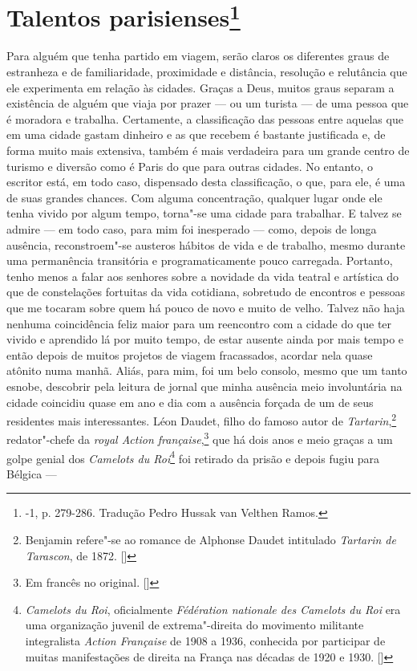 \chapter{Talentos parisienses\footnote[*]{-1, p.
  279-286. Tradução Pedro Hussak van Velthen Ramos.}}

Para alguém que tenha partido em viagem, serão claros os diferentes
graus de estranheza e de familiaridade, proximidade e distância,
resolução e relutância que ele experimenta em relação às cidades. Graças
a Deus, muitos graus separam a existência de alguém que viaja por prazer
--- ou um turista --- de uma pessoa que é moradora e trabalha. Certamente, a
classificação das pessoas entre aquelas que em uma cidade gastam
dinheiro e as que recebem é bastante justificada e, de forma muito mais
extensiva, também é mais verdadeira para um grande centro de turismo e
diversão como é Paris do que para outras cidades. No entanto, o escritor
está, em todo caso, dispensado desta classificação, o que, para ele, é
uma de suas grandes chances. Com alguma concentração, qualquer lugar
onde ele tenha vivido por algum tempo, torna"-se uma cidade para
trabalhar. E talvez se admire --- em todo caso, para mim foi inesperado
--- como, depois de longa ausência, reconstroem"-se austeros hábitos de
vida e de trabalho, mesmo durante uma permanência transitória e
programaticamente pouco carregada. Portanto, tenho menos a falar aos
senhores sobre a novidade da vida teatral e artística do que de
constelações fortuitas da vida cotidiana, sobretudo de encontros e
pessoas que me tocaram sobre quem há pouco de novo e muito de velho.
Talvez não haja nenhuma coincidência feliz maior para um reencontro com
a cidade do que ter vivido e aprendido lá por muito tempo, de estar
ausente ainda por mais tempo e então depois de muitos projetos de viagem
fracassados, acordar nela quase atônito numa manhã. Aliás, para mim, foi
um belo consolo, mesmo que um tanto esnobe, descobrir pela leitura de
jornal que minha ausência meio involuntária na cidade coincidiu quase em
ano e dia com a ausência forçada de um de seus residentes mais
interessantes. Léon Daudet, filho do famoso autor de
\emph{Tartarin},\footnote{Benjamin refere"-se ao romance de Alphonse
  Daudet intitulado \emph{Tartarin de Tarascon}, de 1872. []} redator"-chefe
da \emph{royal Action française},\footnote{Em francês no original. []} que há dois anos e meio graças a um golpe genial dos
\emph{Camelots du Roi}\footnote{\emph{Camelots du Roi},
  oficialmente \emph{Fédération nationale des Camelots du Roi} era uma
  organização juvenil de extrema"-direita do movimento militante
  integralista \emph{Action Française} de 1908 a 1936, conhecida por
  participar de muitas manifestações de direita na França nas décadas de
  1920 e 1930. []} foi retirado da prisão e depois fugiu para Bélgica ---
